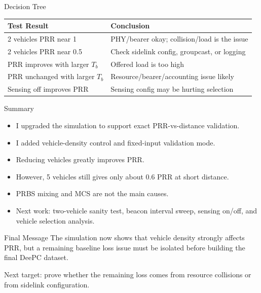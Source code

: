 \documentclass[aspectratio=169,11pt]{beamer}
\begin{document}
\begin{frame}{Decision Tree}
\large
\begin{table}
\centering
\renewcommand{\arraystretch}{1.25}
\begin{tabular}{p{5.2cm} p{6.2cm}}
\toprule
\textbf{Test Result} & \textbf{Conclusion} \\
\midrule
2 vehicles PRR near 1 & PHY/bearer okay; collision/load is the issue \\
2 vehicles PRR near 0.5 & Check sidelink config, groupcast, or logging \\
PRR improves with larger \(T_b\) & Offered load is too high \\
PRR unchanged with larger \(T_b\) & Resource/bearer/accounting issue likely \\
Sensing off improves PRR & Sensing config may be hurting selection \\
\bottomrule
\end{tabular}
\end{table}
\end{frame}

\begin{frame}{Summary}
\large
\begin{itemize}
  \item I upgraded the simulation to support exact PRR-vs-distance validation.
  \item I added vehicle-density control and fixed-input validation mode.
  \item Reducing vehicles greatly improves PRR.
  \item However, 5 vehicles still gives only about 0.6 PRR at short distance.
  \item PRBS mixing and MCS are not the main causes.
  \item Next work: two-vehicle sanity test, beacon interval sweep, sensing on/off, and vehicle selection analysis.
\end{itemize}
\end{frame}

\begin{frame}{Final Message}
\centering
\Large
The simulation now shows that vehicle density strongly affects PRR, but a remaining baseline loss issue must be isolated before building the final DeePC dataset.

\vspace{0.6cm}
\large
Next target: prove whether the remaining loss comes from resource collisions or from sidelink configuration.
\end{frame}
\end{document}
